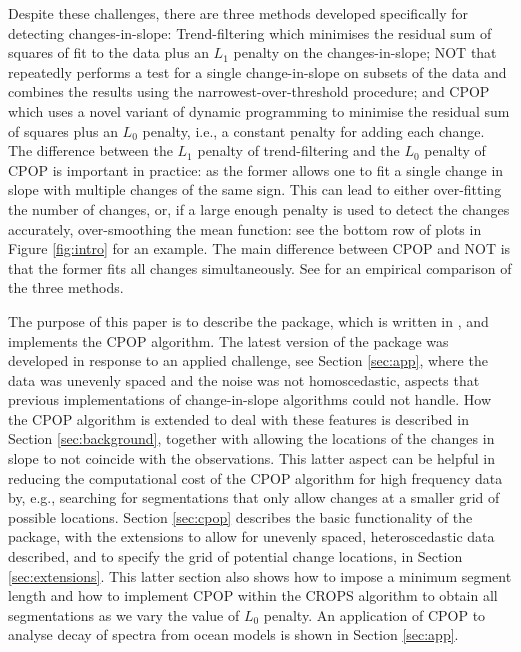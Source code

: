 \documentclass[article]{jss}
\begin{document}
Despite these challenges, there are three methods developed specifically for detecting changes-in-slope: Trend-filtering \citep{kim2009ell_1,tibshirani2014adaptive} which minimises the residual sum of squares of fit to the data plus an $L_1$ penalty on the changes-in-slope; NOT \citep{baranowski2016narrowest} that repeatedly performs a test for a single change-in-slope on subsets of the data and combines the results using the narrowest-over-threshold procedure; and CPOP \citep{fearnhead2019detecting} which uses a novel variant of dynamic programming to minimise the residual sum of squares plus an $L_0$ penalty, i.e., a constant penalty for adding each change. The difference between the $L_1$ penalty of trend-filtering and the $L_0$ penalty of CPOP is important in practice: as the former allows one to fit a single change in slope with multiple changes of the same sign. This can lead to either over-fitting the number of changes, or, if a large enough penalty is used to detect the changes accurately, over-smoothing the mean function: see the bottom row of plots in Figure \ref{fig:intro} for an example. The main difference between CPOP and NOT is that the former fits all changes simultaneously. See \cite{fearnhead2019detecting} for an empirical comparison of the three methods.

The purpose of this paper is to describe the  package, which is written in , and implements the CPOP algorithm. The latest version of the package was developed in response to an applied challenge, see Section \ref{sec:app}, where the data was unevenly spaced and the noise was not homoscedastic, aspects that previous implementations of change-in-slope algorithms could not handle. How the CPOP algorithm is extended to deal with these features is described in Section \ref{sec:background}, together with allowing the locations of the changes in slope to not coincide with the observations. This latter aspect can be helpful in reducing the computational cost of the CPOP algorithm for high frequency data by, e.g., searching for segmentations that only allow changes at a smaller grid of possible locations. Section \ref{sec:cpop} describes the basic functionality of the package, with the extensions to allow for unevenly spaced, heteroscedastic data described, and to specify the grid of potential change locations, in Section \ref{sec:extensions}. This latter section also shows how to impose a minimum segment length and how to implement CPOP within the CROPS algorithm \citep{haynes2017computationally} to obtain all segmentations as we vary the value of $L_0$ penalty. An application of CPOP to analyse decay of spectra from ocean models is shown in Section \ref{sec:app}.
\end{document}
